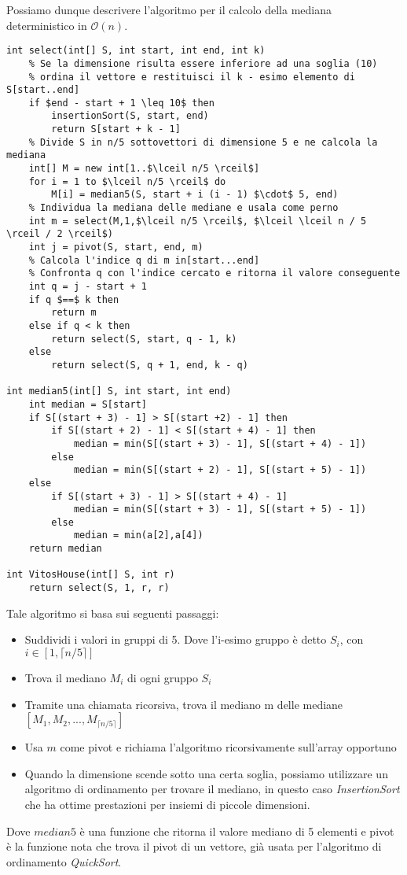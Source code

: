 \documentclass[../cheatSheetAlgoritmi.tex]{subfiles}
\begin{document}
Possiamo dunque descrivere l'algoritmo per il calcolo della mediana deterministico in $\mathcal{O}(n)$.
\begin{lstlisting}[caption=Mediana deterministica in $\mathcal{O}(n)$]
int select(int[] S, int start, int end, int k)
	% Se la dimensione risulta essere inferiore ad una soglia (10) 
	% ordina il vettore e restituisci il k - esimo elemento di S[start..end]
	if $end - start + 1 \leq 10$ then 
		insertionSort(S, start, end)
		return S[start + k - 1]
	% Divide S in n/5 sottovettori di dimensione 5 e ne calcola la mediana
	int[] M = new int[1..$\lceil n/5 \rceil$]
	for i = 1 to $\lceil n/5 \rceil$ do
		M[i] = median5(S, start + i (i - 1) $\cdot$ 5, end)
	% Individua la mediana delle mediane e usala come perno
	int m = select(M,1,$\lceil n/5 \rceil$, $\lceil \lceil n / 5 \rceil / 2 \rceil$)
	int j = pivot(S, start, end, m)
	% Calcola l'indice q di m in[start...end]
	% Confronta q con l'indice cercato e ritorna il valore conseguente
	int q = j - start + 1
	if q $==$ k then
		return m
	else if q < k then
		return select(S, start, q - 1, k)
	else
		return select(S, q + 1, end, k - q)

int median5(int[] S, int start, int end)
	int median = S[start]
	if S[(start + 3) - 1] > S[(start +2) - 1] then
		if S[(start + 2) - 1] < S[(start + 4) - 1] then
			median = min(S[(start + 3) - 1], S[(start + 4) - 1]) 
		else 
			median = min(S[(start + 2) - 1], S[(start + 5) - 1])
	else
		if S[(start + 3) - 1] > S[(start + 4) - 1] 
			median = min(S[(start + 3) - 1], S[(start + 5) - 1]) 
		else 
			median = min(a[2],a[4]) 
	return median

int VitosHouse(int[] S, int r)
	return select(S, 1, r, r)
\end{lstlisting}
Tale algoritmo si basa sui seguenti passaggi: 
\begin{itemize}
	\item Suddividi i valori in gruppi di 5. Dove l’i-esimo gruppo è detto $S_i$, con $i \in [1, \lceil n/5 \rceil]$
	\item Trova il mediano $M_i$ di ogni gruppo $S_i$
	\item Tramite una chiamata ricorsiva, trova il mediano m delle mediane $[M_1,M_2, ... ,M_{\lceil n/5 \rceil}]$
	\item Usa $m$ come pivot e richiama l’algoritmo ricorsivamente sull’array opportuno
	\item Quando la dimensione scende sotto una certa soglia, possiamo utilizzare un algoritmo di ordinamento per trovare il mediano, in questo caso \emph{InsertionSort} che ha ottime prestazioni per insiemi di piccole dimensioni.
\end{itemize}
Dove $median5$ è una funzione che ritorna il valore mediano di 5 elementi e pivot è la funzione nota che trova il pivot di un vettore, già usata per l'algoritmo di ordinamento \emph{QuickSort}.
\newpage
\end{document}
